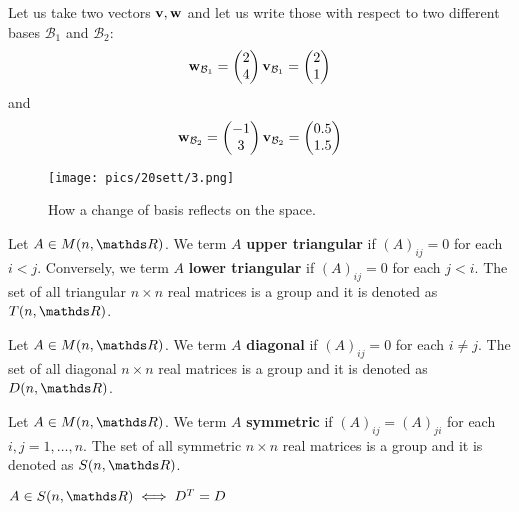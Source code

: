 \documentclass[computationalMathematics.tex]{subfiles}
\begin{document}
\begin{example}
	Let us take two vectors ${\bf v }, {\bf w }$ and let us write those with respect to two different bases $\mathcal{B}_1$ and $\mathcal{B}_2$:
	\[
		{\bf w }_{\mathcal{B}_1} = \begin{pmatrix} 2\\ 4 \end{pmatrix}
		{\bf v }_{\mathcal{B}_1} = \begin{pmatrix} 2\\ 1 \end{pmatrix}
	\]
	and 
	\[
	{\bf w }_{\mathcal{B}_2} = \begin{pmatrix} -1\\ 3 \end{pmatrix}
	{\bf v }_{\mathcal{B}_2} = \begin{pmatrix} 0.5\\ 1.5 \end{pmatrix}
	\]
\begin{figure}[H]
    \centering
    \texttt{[image: pics/20sett/3.png]}
    \caption{How a change of basis reflects on the space.}\label{fig:20sett1}
\end{figure}
\end{example}

\begin{definition}
  Let $A \in M(n, \R)$. We term $A$ \textbf{upper triangular} if ${(A)}_{ij} =0$ for each $i<j$.
  Conversely, we term $A$ \textbf{lower triangular} if ${(A)}_{ij} =0$ for each $j<i$.
  The set of all triangular $n \times n$ real matrices is a group and it is denoted as $T(n, \R)$.
\end{definition}

\begin{definition}
  Let $A \in M(n, \R)$. We term $A$ \textbf{diagonal} if ${(A)}_{ij} = 0$ for each $i \neq j$.
  The set of all diagonal $n \times n$ real matrices is a group and it is denoted as $D(n, \R)$.
\end{definition}

\begin{definition}
  Let $A \in M(n, \R)$. We term $A$ \textbf{symmetric} if ${(A)}_{ij} = {(A)}_{ji}$ for each $i,j = 1, \ldots, n$.
  The set of all symmetric $n \times n$ real matrices is a group and it is denoted as $S(n, \R)$.
\end{definition}

\begin{proposition}
	$A \in S(n, \R) \iff \tr{D} = D$
\end{proposition}
\end{document}
